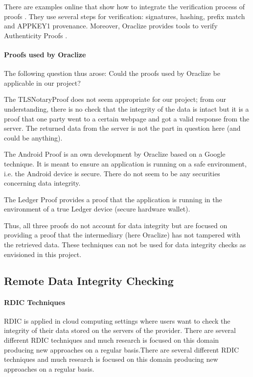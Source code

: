 There are examples online that show how to integrate the verification process of proofs \autocite{relatedWork07}. They use several steps for verification: signatures, hashing, prefix match and APPKEY1 provenance. Moreover, Oraclize provides tools to verify Authenticity Proofs \autocites{relatedWork08}{relatedWork09}.

\paragraph{Proofs used by Oraclize}
The following question thus arose: Could the proofs used by Oraclize be applicable in our project?

The TLSNotaryProof \autocites{relatedWork10}{relatedWork11}{relatedWork12} does not seem appropriate for our project; from our understanding, there is no check that the integrity of the data is intact but it is a proof that one party went to a certain webpage and got a valid response from the server. The returned data from the server is not the part in question here (and could be anything).

The Android Proof \autocite{relatedWork13} is an own development by Oraclize based on a Google technique. It is meant to ensure an application is running on a safe environment, i.e. the Android device is secure. There do not seem to be any securities concerning data integrity.

The Ledger Proof \autocites{relatedWork14}{relatedWork15} provides a proof that the application is running in the environment of a true Ledger device (secure hardware wallet).

Thus, all three proofs do not account for data integrity but are focused on providing a proof that the intermediary (here Oraclize) has not tampered with the retrieved data. These techniques can not be used for data integrity checks as envisioned in this project.

\subsection{Remote Data Integrity Checking}
\paragraph{RDIC Techniques}
RDIC is applied in cloud computing settings where users want to check the integrity of their data stored on the servers of the provider.
There are several different RDIC techniques \autocite{relatedWork16} and much research is focused on this domain producing new approaches on a regular basis.There are several different RDIC techniques and much research is focused on this domain producing new approaches on a regular basis.

